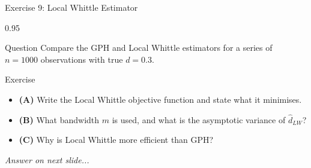 \documentclass[9pt, aspectratio=169, t]{beamer}
\begin{document}
\begin{frame}{Exercise 9: Local Whittle Estimator}
    \begin{cminipage}{0.95\textwidth}
    \begin{alertblock}{Question}
        Compare the GPH and Local Whittle estimators for a series of $n = 1000$ observations with true $d = 0.3$.
    \end{alertblock}

    \vspace{0.2cm}

    \begin{block}{Exercise}
        \begin{itemize}\setlength{\itemsep}{3pt}
            \item \textcolor{MainBlue}{\textbf{(A)}} Write the Local Whittle objective function and state what it minimises.
            \item \textcolor{MainBlue}{\textbf{(B)}} What bandwidth $m$ is used, and what is the asymptotic variance of $\hat{d}_{LW}$?
            \item \textcolor{MainBlue}{\textbf{(C)}} Why is Local Whittle more efficient than GPH?
        \end{itemize}
    \end{block}

    \vspace{0.3cm}

    \begin{center}
        \textit{Answer on next slide...}
    \end{center}
    \end{cminipage}
\end{frame}
\end{document}
